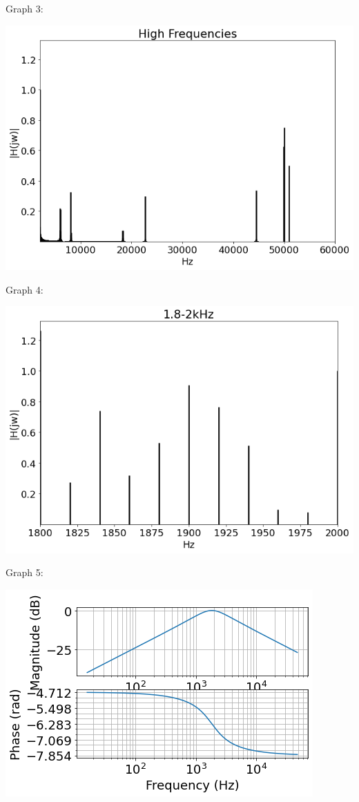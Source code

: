 \documentclass[nobib]{MSword}
\begin{document}
Graph 3:

\includegraphics[scale = .6]
{txt/Lab12Graph3.png}

Graph 4:

\includegraphics[scale = 0.6]
{txt/Lab12Graph4.png}

Graph 5:

\includegraphics[scale = 0.8]
{txt/Lab12Graph5.png}
\end{document}
